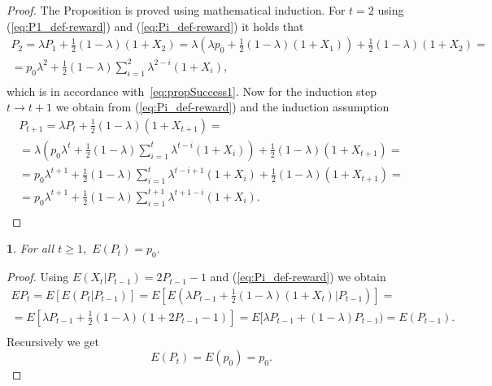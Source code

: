 \documentclass{amsart}
\theoremstyle{definition}
\theoremstyle{plain}
\newtheorem{prop}[thm]{\protect\propositionname}
\theoremstyle{plain}
\theoremstyle{plain}
\numberwithin{equation}{section}
\providecommand{\propositionname}{Proposition}
\begin{document}
    \begin{proof}
        The Proposition is proved using mathematical induction.
        For $t=2$ using (\ref{eq:P1_def-reward})
        and (\ref{eq:Pi_def-reward}) it holds that
        \begin{gather*}
            P_{2}=\lambda P_{1}+\frac{1}{2}(1-\lambda)(1+X_{2})=\lambda(\lambda p_{0}+\frac{1}{2}(1-\lambda)(1+X_{1}))+\frac{1}{2}(1-\lambda)(1+X_{2})=\\
            =p_{0}\lambda^{2}+\frac{1}{2}(1-\lambda)\sum_{i=1}^{2}\lambda^{2-i}(1+X_{i}),\\
        \end{gather*}
        which is in accordance with~\eqref{eq:propSuccess1}.
        Now for the
        induction step $t\rightarrow t+1$ we obtain from (\ref{eq:Pi_def-reward})
        and the induction assumption
        \begin{gather*}
            P_{t+1}=\lambda P_{t}+\frac{1}{2}(1-\lambda)(1+X_{t+1})=\\
            =\lambda(p_{0}\lambda^{t}+\frac{1}{2}(1-\lambda)\sum_{i=1}^{t}\lambda^{t-i}(1+X_{i}))+\frac{1}{2}(1-\lambda)(1+X_{t+1})=\\
            =p_{0}\lambda^{t+1}+\frac{1}{2}(1-\lambda)\sum_{i=1}^{t}\lambda^{t-i+1}(1+X_{i})+\frac{1}{2}(1-\lambda)(1+X_{t+1})=\\
            =p_{0}\lambda^{t+1}+\frac{1}{2}(1-\lambda)\sum_{i=1}^{t+1}\lambda^{t+1-i}(1+X_{i}).\\
        \end{gather*}
    \end{proof}

    \begin{prop}
        \label{PropReward2}For all $t\geq1,$ $E(P_{t})=p_{0}.$
    \end{prop}
    \begin{proof}
        Using $E(X_{t}|P_{t-1})=2P_{t-1}-1$ and (\ref{eq:Pi_def-reward})
        we obtain
        \begin{gather*}
            EP_{t}=E[E(P_{t}|P_{t-1})]=E[E(\lambda P_{t-1}+\frac{1}{2}(1-\lambda)(1+X_{t})|P_{t-1})]=\\
            =E[\lambda P_{t-1}+\frac{1}{2}(1-\lambda)(1+2P_{t-1}-1)]=E[\lambda P_{t-1}+(1-\lambda)P_{t-1})= E(P_{t-1}).\\
        \end{gather*}
        Recursively we get
        \begin{equation}
            E(P_{t})=E(p_{0})=p_{0}.\label{eq:EPt-reward-formula}
        \end{equation}
    \end{proof}
\end{document}
